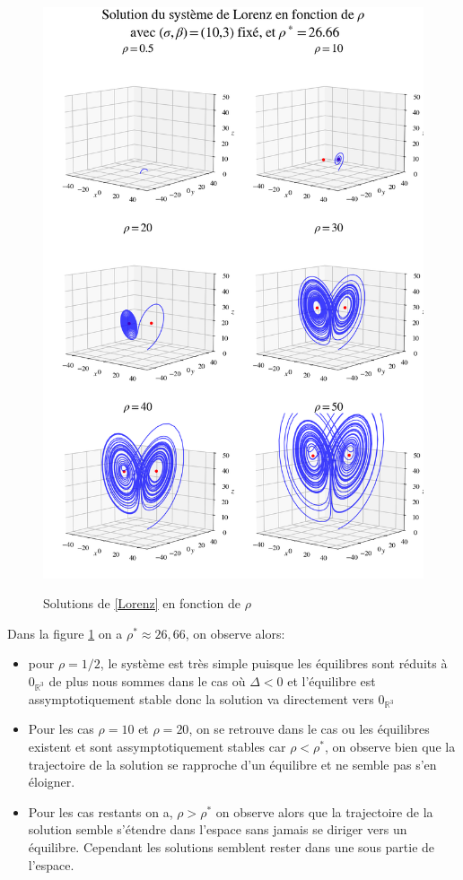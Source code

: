 \documentclass{article}
\newcommand{\R}{\mathbb{R}}
\newtheorem[M , nocut]{prop}{Proposition}[section]
\newtheorem[M , nocut]{definition}{Définition}
\newtheorem[M , nocut]{lemme}{Lemme}
\newtheorem[L , nocut]{thm}{Théoreme}
\newtheorem[M , nocut]{cor}{Corollaire}
\begin{document}
\begin{figure}[!ht]
    \begin{center}
        
        \includegraphics[height=0.73\textheight]{Eq-Spm}
        \label{fig:Eq-Spm}
        \caption{Solutions de \eqref{Lorenz} en fonction de $\rho$}
    \end{center}
\end{figure}

Dans la figure \ref{fig:Eq-Spm} on a $\rho^* \approx 26,66$, on observe alors:
\begin{itemize}
    \item pour $\rho = 1/2$, le système est très simple puisque les équilibres sont réduits à $0_{\R^3}$ de plus nous sommes dans le cas où $\Delta < 0$ et l'équilibre est assymptotiquement stable donc la solution va directement vers $0_{\R^3}$
    \item  Pour les cas $\rho = 10$ et $\rho =20$, on se retrouve dans le cas ou les équilibres existent et sont assymptotiquement stables car $\rho<\rho^*$, on observe bien que la trajectoire de la solution se rapproche d'un équilibre et ne semble pas s'en éloigner.
    \item Pour les cas restants on a, $\rho>\rho^*$ on observe alors que la trajectoire de la solution semble s'étendre dans l'espace sans jamais se diriger vers un équilibre. Cependant les solutions semblent rester dans une sous partie de l'espace.
\end{itemize}
\end{document}
